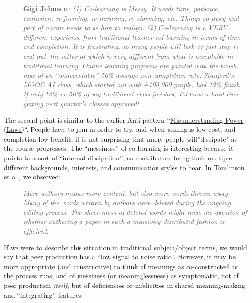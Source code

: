\begin{quote}
\textbf{Gigi Johnson}\emph{: (1) Co-learning is Messy. It needs time,
patience, confusion, re-forming, re-norming, re-storming, etc. Things go
awry and part of norms needs to be how to realign. (2) Co-learning is a
VERY different experience from traditional teacher-led learning in terms
of time and completion. It is frustrating, so many people will lurk or
just step in and out, the latter of which is very different from what is
acceptable in traditonal learning. Online learning programs are painted
with the brush now of an ``unacceptable'' 50\% average non-completion
rate. Stanford's MOOC AI class, which started out with +100,000 people,
had 12\% finish. If only 12\% or 50\% of my traditional class finished,
I'd have a hard time getting next quarter's classes approved!}
\end{quote}
The second point is similar to the earlier Anti-pattern
``\href{http://socialmediaclassroom.com/host/peeragogy/forum/anti-patterns-concerns-complaints-and-critiques\#comment-1854}{Misunderstanding
Power (Laws)}``. People have to join in order to try, and when joining
is low-cost, and completion low-benefit, it is not surprising that many
people will''dissipate" as the course progresses. The ``messiness'' of
co-learning is interesting because it points to a sort of ``internal
dissipation'', as contributors bring their multiple different
backgrounds, interests, and communication styles to bear. In
\href{http://www.altchi.org/submissions/submission\_wmt\_0.pdf}{Tomlinson
et al.}, we observed:

\begin{quote}
\emph{More authors means more content, but also more words thrown away.
Many of the words written by authors were deleted during the ongoing
editing process. The sheer mass of deleted words might raise the
question of whether authoring a paper in such a massively distributed
fashion is efficient.}
\end{quote}
If we were to describe this situation in traditional subject/object
terms, we would say that peer production has a ``low signal to noise
ratio''. However, it may be more appropriate (and constructive) to think
of meanings as co-constructed as the process runs, and of messiness (or
meaninglessness) as symptomatic, not of peer production \emph{itself},
but of deficiencies or infelicities in shared meaning-making and
``integrating'' features.
